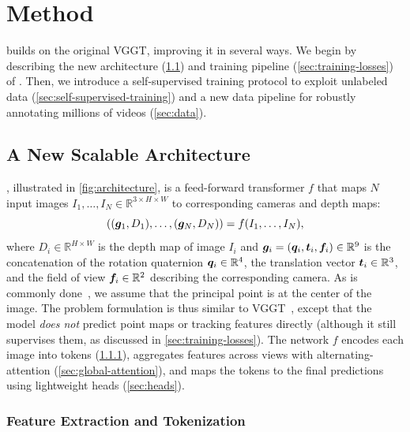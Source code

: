 \newcommand{\zscene}{\bz^{\text{scene}}}
\newcommand{\zcamera}{\bz^{\text{cam}}}

\section{Method}%
\label{sec:method}

\method builds on the original VGGT, improving it in several ways.
We begin by describing the new architecture (\cref{sec:architecture}) and training pipeline (\cref{sec:training-losses}) of \method.
Then, we introduce a self-supervised training protocol to exploit unlabeled data (\cref{sec:self-supervised-training}) and a new data pipeline for robustly annotating millions of videos (\cref{sec:data}).

\subsection{A New Scalable Architecture}%
\label{sec:architecture}

\method, illustrated in \cref{fig:architecture}, is a feed-forward transformer $f$ that maps $N$ input images
$
I_1,\dots,I_N \in \mathbb{R}^{3\times H \times W}
$
to corresponding cameras and depth maps:
$$
((\boldsymbol{g}_1, D_1),\dots,(\boldsymbol{g}_N,D_N))
=
f(I_1,\dots,I_N),
$$
where
$D_i \in \mathbb{R}^{H \times W}$
is the depth map of image $I_i$ and
$\boldsymbol{g}_i = (\boldsymbol{q}_i, \boldsymbol{t}_i, \boldsymbol{f}_i) \in \mathbb{R}^{9}$
is the concatenation of
the {rotation} quaternion $\boldsymbol{q}_i \in \mathbb{R}^4$,
the {translation} vector $\boldsymbol{t}_i \in \mathbb{R}^3$,
and the {field of view} $\boldsymbol{f}_i \in \mathbb{R}^2$
describing the corresponding camera.
As is commonly done~\cite{schonberger16structure-from-motion,wang24vggsfm:,wang25vggt}, we assume that the principal point is at the center of the image.
The problem formulation is thus similar to VGGT~\cite{wang25vggt}, except that the model \emph{does not} predict point maps or tracking features directly (although it still supervises them, as discussed in \cref{sec:training-losses}).
The network $f$ encodes each image into tokens (\cref{sec:feature-extraction-and-tokenization}), aggregates features across views with alternating-attention (\cref{sec:global-attention}), and maps the tokens to the final predictions using lightweight heads (\cref{sec:heads}).

\subsubsection{Feature Extraction and Tokenization}%
\label{sec:feature-extraction-and-tokenization}


